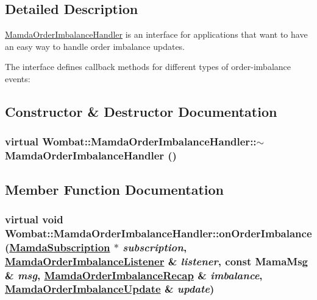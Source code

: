 \subsection{Detailed Description}
\hyperlink{classWombat_1_1MamdaOrderImbalanceHandler}{Mamda\-Order\-Imbalance\-Handler} is an interface for applications that want to have an easy way to handle order imbalance updates. 

The interface defines callback methods for different types of order-imbalance events: 



\subsection{Constructor \& Destructor Documentation}
\hypertarget{classWombat_1_1MamdaOrderImbalanceHandler_571cd007a222b2bebfe98b86623e9b12}{
\subsubsection[$\sim$MamdaOrderImbalanceHandler]{\setlength{\rightskip}{0pt plus 5cm}virtual Wombat::Mamda\-Order\-Imbalance\-Handler::$\sim$Mamda\-Order\-Imbalance\-Handler ()}}
\label{classWombat_1_1MamdaOrderImbalanceHandler_571cd007a222b2bebfe98b86623e9b12}




\subsection{Member Function Documentation}
\hypertarget{classWombat_1_1MamdaOrderImbalanceHandler_9c64bc280a746560b36a2a891db8a68f}{
\subsubsection[onOrderImbalance]{\setlength{\rightskip}{0pt plus 5cm}virtual void Wombat::Mamda\-Order\-Imbalance\-Handler::on\-Order\-Imbalance (\hyperlink{classWombat_1_1MamdaSubscription}{Mamda\-Subscription} $\ast$ {\em subscription}, \hyperlink{classWombat_1_1MamdaOrderImbalanceListener}{Mamda\-Order\-Imbalance\-Listener} \& {\em listener}, const Mama\-Msg \& {\em msg}, \hyperlink{classWombat_1_1MamdaOrderImbalanceRecap}{Mamda\-Order\-Imbalance\-Recap} \& {\em imbalance}, \hyperlink{classWombat_1_1MamdaOrderImbalanceUpdate}{Mamda\-Order\-Imbalance\-Update} \& {\em update})}}
\label{classWombat_1_1MamdaOrderImbalanceHandler_9c64bc280a746560b36a2a891db8a68f}


